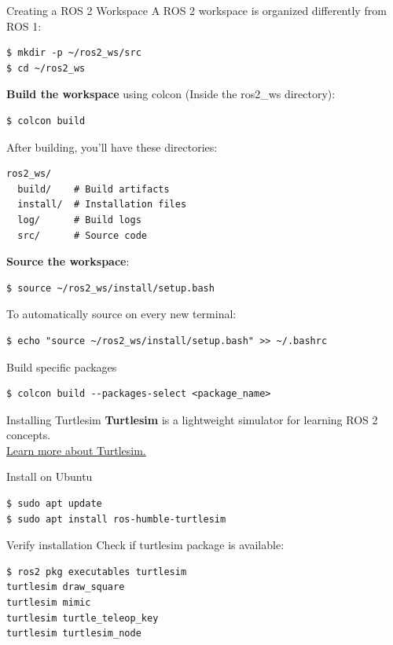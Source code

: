 \begin{frame}{Creating a ROS 2 Workspace}
    A ROS 2 workspace is organized differently from ROS 1:

    \begin{lstlisting}[language=shell]
$ mkdir -p ~/ros2_ws/src
$ cd ~/ros2_ws
\end{lstlisting}

    \textbf{Build the workspace} using colcon (Inside the ros2\_ws directory):
    \begin{lstlisting}[language=shell]
$ colcon build
\end{lstlisting}

    After building, you'll have these directories:
    \begin{lstlisting}[language=syntax]
ros2_ws/
  build/    # Build artifacts
  install/  # Installation files
  log/      # Build logs
  src/      # Source code
\end{lstlisting}

    \framebreak

    \textbf{Source the workspace}:
    \begin{lstlisting}[language=shell]
$ source ~/ros2_ws/install/setup.bash
\end{lstlisting}

    To automatically source on every new terminal:
    \begin{lstlisting}[language=shell]
$ echo "source ~/ros2_ws/install/setup.bash" >> ~/.bashrc
\end{lstlisting}

    \begin{alertblock}{Build specific packages}
        \begin{lstlisting}[language=shell]
$ colcon build --packages-select <package_name>
\end{lstlisting}
    \end{alertblock}
\end{frame}

\begin{frame}[fragile]{Installing Turtlesim}
    \textbf{Turtlesim} is a lightweight simulator for learning ROS 2 concepts.
    \\ \href{https://docs.ros.org/en/humble/Tutorials/Beginner-CLI-Tools/Introducing-Turtlesim/Introducing-Turtlesim.html}{Learn more about Turtlesim.}

    \begin{block}{Install on Ubuntu}
        \begin{lstlisting}[language=shell]
$ sudo apt update
$ sudo apt install ros-humble-turtlesim
\end{lstlisting}
    \end{block}

    \begin{block}{Verify installation}
        Check if turtlesim package is available:
        \begin{lstlisting}[language=shell]
$ ros2 pkg executables turtlesim
turtlesim draw_square
turtlesim mimic
turtlesim turtle_teleop_key
turtlesim turtlesim_node
\end{lstlisting}
    \end{block}
\end{frame}

